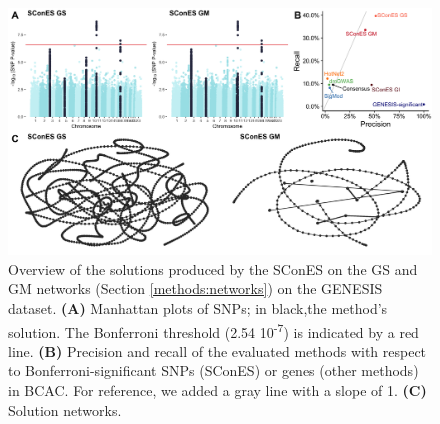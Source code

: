 \documentclass[twocolumn, 11pt]{article}
\begin{document}
\begin{figure}[htbp]
  \centering
  \includegraphics[width=\linewidth]{./figures/sfigure_9.png}
  \caption{Overview of the solutions produced by the SConES on the GS and GM networks (Section \ref{methods:networks}) on the GENESIS dataset. \textbf{(A)} Manhattan plots of SNPs; in black,the method’s solution. The Bonferroni threshold (2.54 \texttimes{} 10\textsuperscript{-7}) is indicated by a red line. \textbf{(B)} Precision and recall of the evaluated methods with respect to Bonferroni-significant SNPs (SConES) or genes (other methods) in BCAC. For reference, we added a gray line with a slope of 1. \textbf{(C)} Solution networks.}
  \label{sfig:scones_gsm}
\end{figure}
\end{document}
